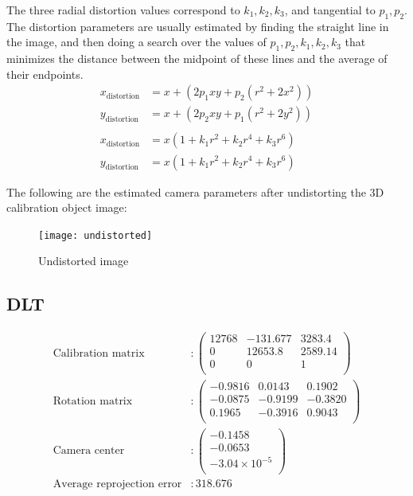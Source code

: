 \documentclass[a4paper,11pt]{article}
\begin{document}
 The three radial distortion values correspond to $k_1, k_2, k_3$, and tangential to $p_1, p_2$. The distortion parameters are usually estimated by finding the straight line in the image, and then doing a search over the values of $p_1,p_2,k_1,k_2,k_3$ that minimizes the distance between the midpoint of these lines and the average of their endpoints.
 \begin{align*}
  x_{\text{distortion}} &= x + (2p_1xy + p_2(r^2 + 2x^2))\\
  y_{\text{distortion}} &= x + (2p_2xy + p_1(r^2 + 2y^2))\\
  \\
  x_{\text{distortion}} &= x(1 + k_1r^2 + k_2r^4 + k_3r^6)\\
  y_{\text{distortion}} &= x(1 + k_1r^2 + k_2r^4 + k_3r^6)
 \end{align*}
 
 The following are the estimated camera parameters after undistorting the 3D calibration object image:
 
   \begin{figure}[H]
      \centering
      \texttt{[image: undistorted]} 
      \caption{Undistorted image}
      \end{figure}
 \subsection*{DLT}
 
   \begin{align*}
  \text{Calibration matrix}
  &:
  \begin{pmatrix}
  12768 & -131.677 & 3283.4 \\
  0 & 12653.8 & 2589.14 \\
  0 & 0 & 1 \\
  \end{pmatrix}\\
  \text{Rotation matrix}
  &:
  \begin{pmatrix}
   -0.9816 & 0.0143 & 0.1902 \\
   -0.0875 & -0.9199 & -0.3820 \\
   0.1965 & -0.3916 & 0.9043 \\
  \end{pmatrix}\\
  \text{Camera center}
  &:
  \begin{pmatrix}
   -0.1458\\
   -0.0653\\
   -3.04\times10^{-5}\\
  \end{pmatrix}\\
  \text{Average reprojection error}
  &: 318.676\\
  \end{align*}
 
\end{document}
